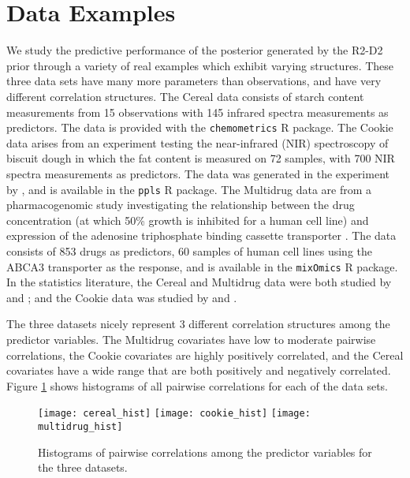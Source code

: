 \documentclass[12pt]{article}
\begin{document}
\section{Data Examples}
We study the predictive performance of the posterior generated by the  R2-D2  prior through a variety of real examples which exhibit varying structures. These three data sets have many more parameters than observations, and have very different correlation structures.
The Cereal data consists of starch content measurements from 15 observations with 145 infrared spectra measurements as predictors.
The data is provided with the \verb#chemometrics# R package.
The Cookie data arises from an experiment testing the near-infrared (NIR) spectroscopy of biscuit dough in which the fat content is measured on 72 samples, with 700 NIR spectra measurements as predictors.
The data was generated in the experiment by \cite{osborne1984application}, and is available in the \verb#ppls# R package.
The Multidrug data are from a pharmacogenomic study investigating the relationship between the drug concentration (at which 50\% growth is inhibited for a human cell line) and expression of the adenosine triphosphate binding cassette transporter \citep{szakacs2004predicting}.
The data consists of 853 drugs as predictors, 60 samples of human cell lines using the ABCA3 transporter as the response, and is available in the \verb#mixOmics# R package.
In the statistics literature, the Cereal and Multidrug data were both studied by \cite{polson2012local} and \cite{griffin2013some}; and the Cookie data was studied by \cite{brown2001bayesian} and \cite{ghosh2015bayesian}.

The three datasets nicely represent 3 different correlation structures among the predictor variables. The Multidrug covariates have low to moderate pairwise correlations, the Cookie covariates are highly positively correlated, and the Cereal covariates have a wide range that are both positively and negatively correlated.
Figure \ref{figure-histogram} shows histograms of all pairwise correlations for each of the data sets.

\begin{figure}[htbp]
	\centering
	\texttt{[image: cereal\_hist]}
	\texttt{[image: cookie\_hist]}
	\texttt{[image: multidrug\_hist]}
	\caption{Histograms of pairwise correlations among the predictor variables for the three datasets.}
	\label{figure-histogram}
\end{figure}
\end{document}
